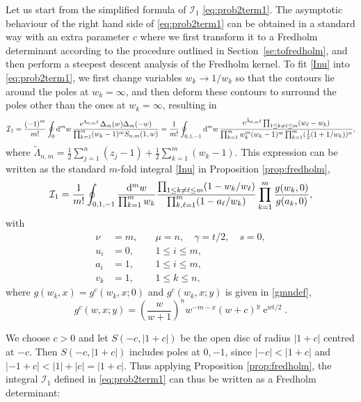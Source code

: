 \documentclass[cmp]{svjour}
\numberwithin{theorem}{section}
\numberwithin{equation}{section}
\DeclareMathOperator{\e}{e}
\def\dd{{\rm d}}
\begin{document}
Let us start from the simplified formula of $\mathcal{I}_1$ \eqref{eq:prob2term1}.
The asymptotic behaviour of the right hand side of \eqref{eq:prob2term1} can be obtained in a standard way with an extra parameter $c$ where we first transform it to a Fredholm determinant according to the procedure outlined in Section~\ref{se:tofredholm}, and then perform a steepest descent analysis of the Fredholm kernel. To fit \eqref{Inu} into \eqref{eq:prob2term1}, we first change variables $w_k \rightarrow 1/w_k$ so that the contours lie around the poles at $w_k=\infty$, and then deform these contours to surround the poles other than the ones at $w_k=\infty$, resulting in
\begin{equation*}
\mathcal{I}_1=  \frac{{(-1)}^m  }{m!}\oint_{ 0} \dd^m w\,  \frac{  \e^{\Lambda_{0,m} t} \Delta_m(w) \Delta_m(-w)  }
{ \prod_{k=1}^m (w_k-1)^{m} S_{n,m}(1,w)}  =
\frac{1}{m!}
\oint_{0,1,-1} \dd^m w\,
\frac{  \e^{\tilde{\Lambda}_{0,m} t} \prod_{1\leq k \neq \ell\leq m}(w_\ell-w_k)}
       {\prod_{k=1}^m w_k^m (w_k-1)^m \prod_{k=1}^m (\frac12(1+1/w_k))^n},
\end{equation*}
where $\tilde{\Lambda}_{n,m}=\frac12\sum_{j=1}^n(z_j-1)+\frac12\sum_{k=1}^m(w_k-1)$. This expression can be written as the standard $m$-fold integral \eqref{Inu} in Proposition \ref{prop:fredholm},
\begin{equation*}
	\mathcal{I}_1 = \frac{1}{m!}\oint_{0,1,-1} \frac{\dd^m w}{ \prod_{k=1}^m w_k} \frac{\prod_{1\leq k\neq \ell\leq m}(1-w_k/w_\ell)}{\prod_{k,\ell=1}^m (1-a_\ell/w_k)} \prod_{k=1}^m \frac{g(w_k,0 )}{g(a_k,0)},
\end{equation*}
with
\[
\begin{array}{rll}
	\nu &=m, \quad &\mu=n, \quad \gamma = t/2,\quad s=0,\\
	u_i &=0, & 1\le i \le m, \\
	a_i &=1, & 1\le i\le m,\\
	v_k &=1, & 1\le k\le n,
\end{array}
\]
where $g(w_k,x) = g^c(w_k,x;0)$ and $g^c(w_k,x;y)$ is given in \eqref{gmndef},
\begin{equation*}
	\label{g_first_term}
	g^c(w,x;y)= \left(\frac{w}{w+1}\right)^n w^{-m -x} {(w + c)}^y \e^{wt/2}.
\end{equation*}

We choose $c>0$ and let $S(-c,|1+c|)$ be the open disc of radius $|1+c|$ centred at $-c$. Then $S(-c,|1+c|)$ includes poles at $0,-1$, since $|-c|<|1+c|$ and $|-1+c|<|1|+|c|=|1+c|$. Thus applying Proposition \ref{prop:fredholm}, the integral $\mathcal{I}_1$ defined in \eqref{eq:prob2term1} can thus be written as a Fredholm determinant:
\end{document}
